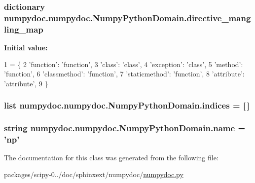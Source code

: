\subsubsection[{directive\+\_\+mangling\+\_\+map}]{\setlength{\rightskip}{0pt plus 5cm}dictionary numpydoc.\+numpydoc.\+Numpy\+Python\+Domain.\+directive\+\_\+mangling\+\_\+map\hspace{0.3cm}{\ttfamily [static]}}\label{classnumpydoc_1_1numpydoc_1_1NumpyPythonDomain_a6504d63f4e067e91b7aa856d427ea7c5}
{\bfseries Initial value\+:}
\begin{DoxyCode}
1 = \{
2         \textcolor{stringliteral}{'function'}: \textcolor{stringliteral}{'function'},
3         \textcolor{stringliteral}{'class'}: \textcolor{stringliteral}{'class'},
4         \textcolor{stringliteral}{'exception'}: \textcolor{stringliteral}{'class'},
5         \textcolor{stringliteral}{'method'}: \textcolor{stringliteral}{'function'},
6         \textcolor{stringliteral}{'classmethod'}: \textcolor{stringliteral}{'function'},
7         \textcolor{stringliteral}{'staticmethod'}: \textcolor{stringliteral}{'function'},
8         \textcolor{stringliteral}{'attribute'}: \textcolor{stringliteral}{'attribute'},
9     \}
\end{DoxyCode}
\hypertarget{classnumpydoc_1_1numpydoc_1_1NumpyPythonDomain_a41da9d63ee4a179d7e1333eee8168ec4}{}
\subsubsection[{indices}]{\setlength{\rightskip}{0pt plus 5cm}list numpydoc.\+numpydoc.\+Numpy\+Python\+Domain.\+indices = \mbox{[}$\,$\mbox{]}\hspace{0.3cm}{\ttfamily [static]}}\label{classnumpydoc_1_1numpydoc_1_1NumpyPythonDomain_a41da9d63ee4a179d7e1333eee8168ec4}
\hypertarget{classnumpydoc_1_1numpydoc_1_1NumpyPythonDomain_ac79282fb89505f778362bf4d70dbfdce}{}
\subsubsection[{name}]{\setlength{\rightskip}{0pt plus 5cm}string numpydoc.\+numpydoc.\+Numpy\+Python\+Domain.\+name = 'np'\hspace{0.3cm}{\ttfamily [static]}}\label{classnumpydoc_1_1numpydoc_1_1NumpyPythonDomain_ac79282fb89505f778362bf4d70dbfdce}


The documentation for this class was generated from the following file\+:\begin{DoxyCompactItemize}
\item 
packages/scipy-\/0../doc/sphinxext/numpydoc/\hyperlink{numpydoc_8py}{numpydoc.\+py}\end{DoxyCompactItemize}
